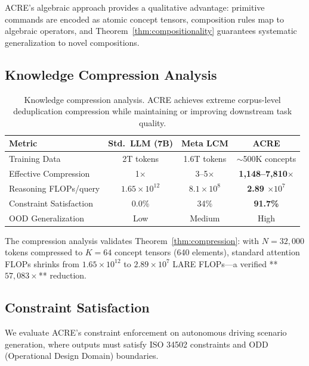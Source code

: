 \documentclass{article}
\begin{document}
ACRE's algebraic approach provides a qualitative advantage: primitive commands are encoded as atomic concept tensors, composition rules map to algebraic operators, and Theorem~\ref{thm:compositionality} guarantees systematic generalization to novel compositions.

\subsection{Knowledge Compression Analysis}

\begin{table}[h]
\centering
\caption{Knowledge compression analysis. ACRE achieves extreme corpus-level deduplication compression while maintaining or improving downstream task quality.}
\label{tab:compression}
\begin{tabular}{lccc}
\toprule
\textbf{Metric} & \textbf{Std.\ LLM (7B)} & \textbf{Meta LCM} & \textbf{ACRE} \\
\midrule
Training Data & 2T tokens & 1.6T tokens & $\sim$500K concepts \\
Effective Compression & 1$\times$ & 3--5$\times$ & \textbf{1,148--7,810$\times$} \\
Reasoning FLOPs/query & $1.65 \times 10^{12}$ & $8.1 \times 10^8$ & \textbf{2.89 $\times 10^7$} \\
Constraint Satisfaction & 0.0\% & 34\% & \textbf{91.7\%} \\
OOD Generalization & Low & Medium & High \\
\bottomrule
\end{tabular}
\end{table}

The compression analysis validates Theorem~\ref{thm:compression}: with $N = 32{,}000$ tokens compressed to $K = 64$ concept tensors (640 elements), standard attention FLOPs shrinks from $1.65 \times 10^{12}$ to $2.89 \times 10^7$ LARE FLOPs---a verified **$57{,}083\times$** reduction.

\subsection{Constraint Satisfaction}

We evaluate ACRE's constraint enforcement on autonomous driving scenario generation, where outputs must satisfy ISO 34502 constraints and ODD (Operational Design Domain) boundaries.
\end{document}
